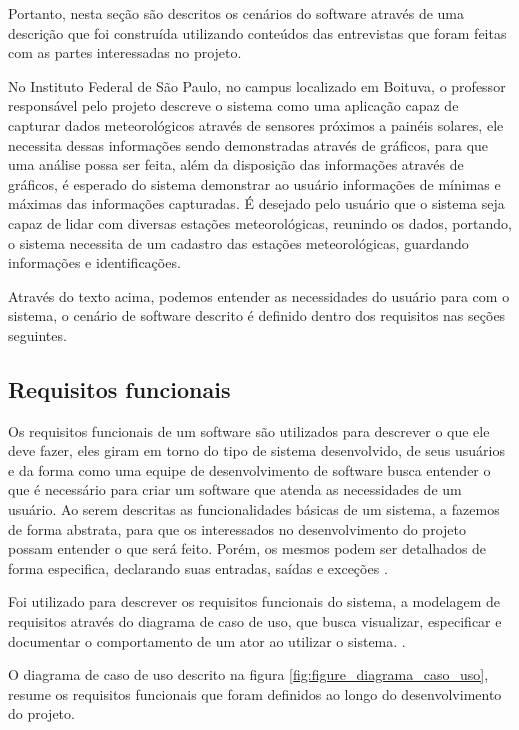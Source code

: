 Portanto, nesta seção são descritos os cenários do software através de uma descrição que foi construída utilizando conteúdos das entrevistas que foram feitas com as partes interessadas no projeto.

No Instituto Federal de São Paulo, no campus localizado em Boituva, o professor responsável pelo projeto descreve o sistema como uma aplicação capaz de capturar dados meteorológicos através de sensores próximos a painéis solares, ele necessita dessas informações sendo demonstradas através de gráficos, para que uma análise possa ser feita, além da disposição das informações através de gráficos, é esperado do sistema demonstrar ao usuário informações de mínimas e máximas das informações capturadas. É desejado pelo usuário que o sistema seja capaz de lidar com diversas estações meteorológicas, reunindo os dados, portando, o sistema necessita de um cadastro das estações meteorológicas, guardando informações e identificações.

Através do texto acima, podemos entender as necessidades do usuário para com o sistema, o cenário de software descrito é definido dentro dos requisitos nas seções seguintes.

\subsection{Requisitos funcionais}

Os requisitos funcionais de um software são utilizados para descrever o que ele deve fazer, eles giram em torno do tipo de sistema desenvolvido, de seus usuários e da forma como uma equipe de desenvolvimento de software busca entender o que é necessário para criar um software que atenda as necessidades de um usuário. Ao serem descritas as funcionalidades básicas de um sistema, a fazemos de forma abstrata, para que os interessados no desenvolvimento do projeto possam entender o que será feito. Porém, os mesmos podem ser detalhados de forma especifica, declarando suas entradas, saídas e exceções \cite{engenharia_software_sommerville}.

Foi utilizado para descrever os requisitos funcionais do sistema, a modelagem de requisitos através do diagrama de caso de uso, que busca visualizar, especificar e documentar o comportamento de um ator ao utilizar o sistema. \cite{uml_pratica}.

O diagrama de caso de uso descrito na figura \ref{fig:figure_diagrama_caso_uso}, resume os requisitos funcionais que foram definidos ao longo do desenvolvimento do projeto.

